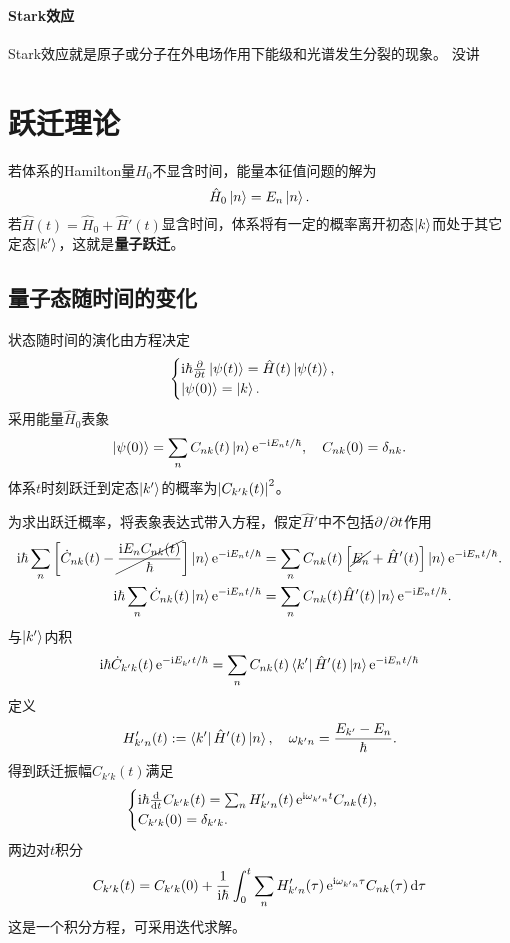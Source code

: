 \paragraph*{Stark效应}Stark效应就是原子或分子在外电场作用下能级和光谱发生分裂的现象。
没讲
\clearpage
\section{跃迁理论}
若体系的Hamilton量$\hat H_0$不显含时间，能量本征值问题的解为
\[
	\hat H_0\ket n=E_n\ket n.
\]
若$\hat H(t)=\hat H_0+\hat H'(t)$显含时间，体系将有一定的概率离开初态$\ket{k}$而处于其它定态$\ket{k'}$，这就是\textbf{量子跃迁}。
\subsection{量子态随时间的变化}
状态随时间的演化由\Schr 方程决定
\begin{align}
	\begin{cases}
		\i\hbar\pp t\ket{\psi(t)}=\hat H(t)\ket{\psi(t)},\\
		\ket{\psi(0)}=\ket{k}.
	\end{cases}
\end{align}
采用能量$\hat H_0$表象 
\begin{align}
	\ket{\psi(0)}=\sum_n C_{nk}(t)\ket n\e{-\i E_nt/\hbar},\quad C_{nk}(0)=\vd_{nk}.
\end{align}
体系$t$时刻跃迁到定态$\ket{k'}$的概率为$\abs{C_{k'k}(t)}^2$。

为求出跃迁概率，将表象表达式带入\Schr 方程，假定$\hat H'$中不包括$\p/\p t$作用
{\small\begin{align}\notag
	\i\hbar\sum_n\fkh{\dot C_{nk}(t)-\cancel{\frac{\i E_nC_{nk}(t)}\hbar}}\ket n\e{-\i E_nt/\hbar}&=\sum_nC_{nk}(t)\fkh{\cancel{E_n}+\hat H'(t)}\ket n\e{-\i E_nt/\hbar}.\\
	\i\hbar\sum_n\dot C_{nk}(t)\ket n\e{-\i E_nt/\hbar}&=\sum_nC_{nk}(t)\hat H'(t)\ket n\e{-\i E_nt/\hbar}.
\end{align}}
与$\ket{k'}$内积
\begin{align}
	\i\hbar\dot C_{k'k}(t)\e{-\i E_{k'}t/\hbar}=\sum_nC_{nk}(t)\bra{k'}\hat H'(t)\ket n\e{-\i E_nt/\hbar}
\end{align}
定义 
\begin{align}
	H_{k'n}'(t):=\bra{k'}\hat H'(t)\ket n,\quad\omega_{k'n}=\frac{E_{k'}-E_n}\hbar.
\end{align}
得到跃迁振幅$C_{k'k}(t)$满足 
\begin{align}
	\begin{cases}
		\i\hbar\dd tC_{k'k}(t)=\sum_nH'_{k'n}(t)\e{\i\omega_{k'n}t}C_{nk}(t),\\
		C_{k'k}(0)=\vd_{k'k}.
	\end{cases}
\end{align}
两边对$t$积分
\begin{align}
	C_{k'k}(t)=C_{k'k}(0)+\frac1{\i\hbar}\int_0^t\sum_nH'_{k'n}(\tau)\e{\i\omega_{k'n}\tau}C_{nk}(\tau)\d\tau
\end{align}
这是一个积分方程，可采用迭代求解。

